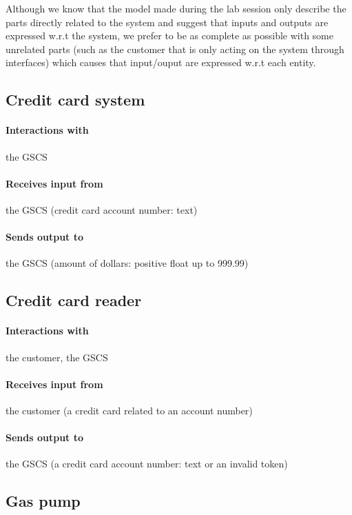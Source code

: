 Although we know that the model made during the lab session only describe the
parts directly related to the system and suggest that inputs and outputs are
expressed w.r.t the system, we prefer to be as complete as possible with some
unrelated parts (such as the customer that is only acting on the system through
interfaces) which causes that input/ouput are expressed w.r.t each entity.

\subsection{Credit card system}

\paragraph{Interactions with} the GSCS

\paragraph{Receives input from} the GSCS (credit card account number: text)

\paragraph{Sends output to} the GSCS (amount of dollars: positive float up to
999.99)

\subsection{Credit card reader}

\paragraph{Interactions with} the customer, the GSCS

\paragraph{Receives input from} the customer (a credit card related to an
account number)

\paragraph{Sends output to} the GSCS (a credit card account number: text or
an invalid token)

\subsection{Gas pump}

